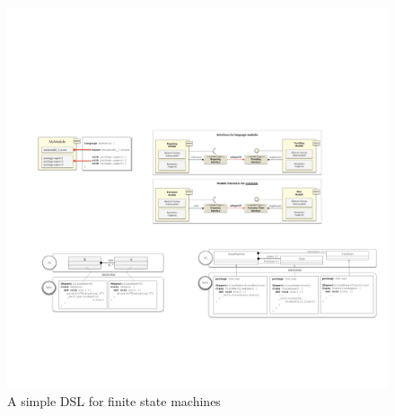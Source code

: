 \begin{figure}
\centering
\includegraphics[width=1\linewidth]{images/k3-example-fig}
\caption{A simple DSL for finite state machines}
\label{fig:k3-example}
\end{figure}

 
%    

